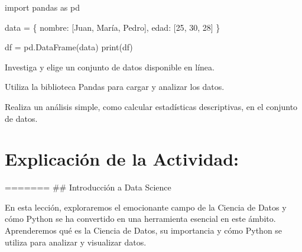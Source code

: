 \documentclass[
  a4paper,
  DIV=11,
  numbers=noendperiod,
  onepage,
  openany]{scrreprt}
\newenvironment{Shaded}{\begin{snugshade}}{\end{snugshade}}
\newcommand{\BuiltInTok}[1]{\textcolor[rgb]{0.00,0.23,0.31}{#1}}
\newcommand{\DecValTok}[1]{\textcolor[rgb]{0.68,0.00,0.00}{#1}}
\newcommand{\ImportTok}[1]{\textcolor[rgb]{0.00,0.46,0.62}{#1}}
\newcommand{\NormalTok}[1]{\textcolor[rgb]{0.00,0.23,0.31}{#1}}
\newcommand{\OperatorTok}[1]{\textcolor[rgb]{0.37,0.37,0.37}{#1}}
\newcommand{\StringTok}[1]{\textcolor[rgb]{0.13,0.47,0.30}{#1}}
\begin{document}
\begin{Shaded}
\begin{Highlighting}[]
\ImportTok{import}\NormalTok{ pandas }\ImportTok{as}\NormalTok{ pd}

\NormalTok{data }\OperatorTok{=}\NormalTok{ \{}
    \StringTok{\textquotesingle{}nombre\textquotesingle{}}\NormalTok{: [}\StringTok{\textquotesingle{}Juan\textquotesingle{}}\NormalTok{, }\StringTok{\textquotesingle{}María\textquotesingle{}}\NormalTok{, }\StringTok{\textquotesingle{}Pedro\textquotesingle{}}\NormalTok{],}
    \StringTok{\textquotesingle{}edad\textquotesingle{}}\NormalTok{: [}\DecValTok{25}\NormalTok{, }\DecValTok{30}\NormalTok{, }\DecValTok{28}\NormalTok{]}
\NormalTok{\}}

\NormalTok{df }\OperatorTok{=}\NormalTok{ pd.DataFrame(data)}
\BuiltInTok{print}\NormalTok{(df)}
\end{Highlighting}
\end{Shaded}

\begin{tcolorbox}[enhanced jigsaw, colbacktitle=quarto-callout-important-color!10!white, toprule=.15mm, leftrule=.75mm, titlerule=0mm, opacityback=0, rightrule=.15mm, opacitybacktitle=0.6, breakable, left=2mm, coltitle=black, title=\textcolor{quarto-callout-important-color}{\faExclamation}\hspace{0.5em}{Actividad Práctica:}, toptitle=1mm, bottomtitle=1mm, arc=.35mm, bottomrule=.15mm, colback=white, colframe=quarto-callout-important-color-frame]

Investiga y elige un conjunto de datos disponible en línea.

Utiliza la biblioteca Pandas para cargar y analizar los datos.

Realiza un análisis simple, como calcular estadísticas descriptivas, en
el conjunto de datos.

\end{tcolorbox}

\hypertarget{explicaciuxf3n-de-la-actividad-78}{%
\section{Explicación de la
Actividad:}\label{explicaciuxf3n-de-la-actividad-78}}

======= \#\# Introducción a Data Science

En esta lección, exploraremos el emocionante campo de la Ciencia de
Datos y cómo Python se ha convertido en una herramienta esencial en este
ámbito. Aprenderemos qué es la Ciencia de Datos, su importancia y cómo
Python se utiliza para analizar y visualizar datos.
\end{document}
